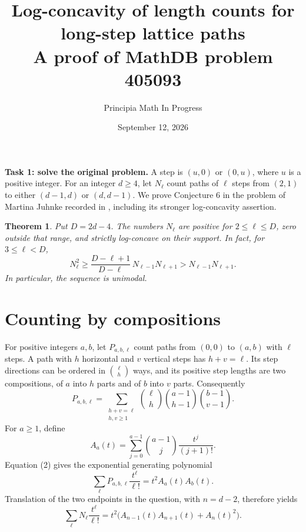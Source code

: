 \documentclass[10pt]{article}
\title{Log-concavity of length counts for long-step lattice paths\\
\large A proof of MathDB problem 405093}
\author{Principia Math In Progress}
\date{September 12, 2026}
\newtheorem{theorem}{Theorem}
\begin{document}
\maketitle

\noindent\textbf{Task 1: solve the original problem.}
A step is $(u,0)$ or $(0,u)$, where $u$ is a positive integer.
For an integer $d\ge4$, let $N_\ell$ count paths of $\ell$ steps from
$(2,1)$ to either $(d-1,d)$ or $(d,d-1)$. We prove Conjecture 6
in the problem of Martina Juhnke recorded in
\cite[p.~150]{OWR}, including its stronger log-concavity assertion.

\begin{theorem}\label{main}
Put $D=2d-4$. The numbers $N_\ell$ are positive for
$2\le\ell\le D$, zero outside that range, and strictly log-concave
on their support. In fact, for $3\le\ell<D$,
\[
 N_\ell^2\ge\frac{D-\ell+1}{D-\ell}\,
                  N_{\ell-1}N_{\ell+1}
       >N_{\ell-1}N_{\ell+1}.                          \tag{1}
\]
In particular, the sequence is unimodal.
\end{theorem}

\section{Counting by compositions}
For positive integers $a,b$, let $P_{a,b,\ell}$ count paths from
$(0,0)$ to $(a,b)$ with $\ell$ steps. A path with $h$ horizontal
and $v$ vertical steps has $h+v=\ell$. Its step directions can be
ordered in $\binom{\ell}{h}$ ways, and its positive step lengths are
two compositions, of $a$ into $h$ parts and of $b$ into $v$ parts.
Consequently
\[
 P_{a,b,\ell}
 =\sum_{\substack{h+v=\ell\\h,v\ge1}}
       \binom{\ell}{h}\binom{a-1}{h-1}\binom{b-1}{v-1}. \tag{2}
\]
For $a\ge1$, define
\[
 A_a(t)=\sum_{j=0}^{a-1}\binom{a-1}{j}\frac{t^j}{(j+1)!}.
\]
Equation (2) gives the exponential generating polynomial
\[
 \sum_\ell P_{a,b,\ell}\frac{t^\ell}{\ell!}
       =t^2A_a(t)A_b(t).                              \tag{3}
\]
Translation of the two endpoints in the question, with $n=d-2$,
therefore yields
\[
 \sum_\ell N_\ell\frac{t^\ell}{\ell!}
   =t^2\bigl(A_{n-1}(t)A_{n+1}(t)+A_n(t)^2\bigr).
                                                               \tag{4}
\]
\end{document}
